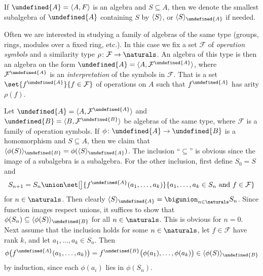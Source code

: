 \documentclass[article, a4paper, 11pt, oneside]{memoir}
\let\mathfrak\undefined
\numberwithin{equation}{chapter}
\newcommand{\calF}{\mathcal{F}}
\DeclarePairedDelimiter{\gen}{\langle}{\rangle} %
\newcommand{\frakA}{\mathfrak{A}}
\newcommand{\frakB}{\mathfrak{B}}
\theoremstyle{nonumberplain}
\begin{document}
\begin{remarkbreak}
    \label{rem:generating-subalgebra}
    If $\frakA = \langle A, F \rangle$ is an algebra and $S \subseteq A$, then we denote the smallest subalgebra of $\frakA$ containing $S$ by $\gen{S}$, or $\gen{S}_{\frakA}$ if needed.

    Often we are interested in studying a family of algebras of the same type (groups, rings, modules over a fixed ring, etc.). In this case we fix a set $\calF$ of \emph{operation symbols} and a similarity type $\rho \colon \calF \to \naturals$. An algebra of this type is then an algebra on the form $\frakA = \langle A, \calF^\frakA \rangle$, where $\calF^\frakA$ is an \emph{interpretation} of the symbols in $\calF$. That is a set $\set{f^\frakA}{f \in \calF}$ of operations on $A$ such that $f^\frakA$ has arity $\rho(f)$.

    Let $\frakA = \langle A, \calF^\frakA \rangle$ and $\frakB = \langle B, \calF^\frakB \rangle$ be algebras of the same type, where $\calF$ is a family of operation symbols. If $\phi \colon \frakA \to \frakB$ is a homomorphism and $S \subseteq A$, then we claim that $\gen{\phi(S)}_\frakB = \phi(\gen{S}_\frakA)$. The inclusion \enquote{$\subseteq$} is obvious since the image of a subalgebra is a subalgebra. For the other inclusion, first define $S_0 = S$ and
    \begin{equation*}
        S_{n+1}
            = S_n \union \set[\big]{f^\frakA(a_1, \ldots, a_k)}{a_1, \ldots, a_k \in S_n \text{ and } f \in \calF}
    \end{equation*}
    for $n \in \naturals$. Then clearly $\gen{S}_\frakA = \bigunion_{n\in\naturals} S_n$. Since function images respect unions, it suffices to show that $\phi(S_n) \subseteq \gen{\phi(S)}_\frakB$ for all $n \in \naturals$. This is obvious for $n = 0$. Next assume that the inclusion holds for some $n \in \naturals$, let $f \in \calF$ have rank $k$, and let $a_1, \ldots, a_k \in S_n$. Then
    \begin{equation*}
        \phi \bigl( f^\frakA(a_1, \ldots, a_k) \bigr)
            = f^\frakB \bigl( \phi(a_1), \ldots, \phi(a_k) \bigr)
            \in \gen{\phi(S)}_\frakB
    \end{equation*}
    by induction, since each $\phi(a_i)$ lies in $\phi(S_n)$.
\end{remarkbreak}
\end{document}
